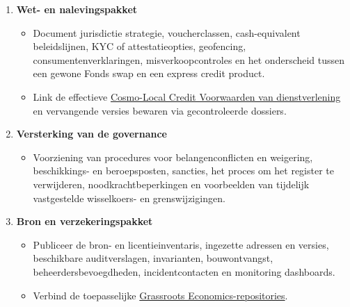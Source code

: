 \documentclass[11pt]{article}
\begin{document}
\begin{enumerate}[leftmargin=*]
\begin{itemize}[leftmargin=*]
\end{itemize}
\item \textbf{Wet- en nalevingspakket}
\begin{itemize}[leftmargin=*]
\item Document jurisdictie strategie, voucherclassen, cash-equivalent beleidslijnen, KYC of attestatieopties, geofencing, consumentenverklaringen, misverkoopcontroles en het onderscheid tussen een gewone Fonds swap en een express credit product.
\item Link de effectieve \href{https://docs.cosmolocal.credit/nl/governance/terms}{Cosmo-Local Credit Voorwaarden van dienstverlening} en vervangende versies bewaren via gecontroleerde dossiers.
\end{itemize}
\item \textbf{Versterking van de governance}
\begin{itemize}[leftmargin=*]
\item Voorziening van procedures voor belangenconflicten en weigering, beschikkings- en beroepsposten, sancties, het proces om het register te verwijderen, noodkrachtbeperkingen en voorbeelden van tijdelijk vastgestelde wisselkoers- en grenswijzigingen.
\end{itemize}
\item \textbf{Bron en verzekeringspakket}
\begin{itemize}[leftmargin=*]
\item Publiceer de bron- en licentieinventaris, ingezette adressen en versies, beschikbare auditverslagen, invarianten, bouwontvangst, beheerdersbevoegdheden, incidentcontacten en monitoring dashboards.
\item Verbind de toepasselijke \href{https://github.com/grassrootseconomics}{Grassroots Economics-repositories}.
\end{itemize}
\end{enumerate}
\end{document}
